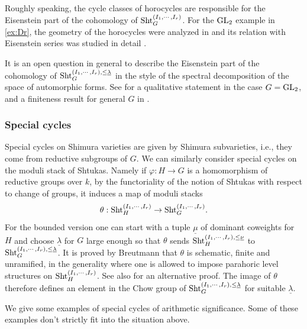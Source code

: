 \documentclass[11pt]{amsart}
\numberwithin{equation}{section}
\theoremstyle{plain}
\theoremstyle{definition}
\newcommand\Sht{\textup{Sht}}
\newcommand\GL{\textup{GL}}
\newcommand\un{\underline}
\newcommand\sss{\subsubsection}
\renewcommand{\th}{\theta}
\newcommand{\ph}{\varphi}
\renewcommand{\l}{\lambda}
\begin{document}
Roughly speaking, the cycle classes of horocycles are responsible for the Eisenstein part of the cohomology of $\Sht_{G}^{(I_{1},\cdots, I_{r})}$. For the $\GL_{2}$ example in \ref{ex:Dr}, the geometry of the horocycles were analyzed in \cite[\S4]{Dr-FBun} and its relation with Eisenstein series was studied in detail \cite[\S3]{Dr-Pet}.

It is an open question in general to describe the Eisenstein part of the cohomology of $\Sht_{G}^{(I_{1},\cdots, I_{r}),\le\un\l}$ in the style of the spectral decomposition of the space of automorphic forms. See \cite[\S7]{YZ1} for a qualitative statement in the case $G=\GL_{2}$, and a finiteness result for general $G$ in \cite{X}.

\sss{Special cycles}

Special cycles on Shimura varieties are given by Shimura subvarieties, i.e., they come from reductive subgroups of $G$. We can similarly consider special cycles on the moduli stack of Shtukas. Namely if $\ph: H\to G$ is a homomorphism of reductive groups over $k$, by the functoriality of the notion of Shtukas with respect to change of groups, it induces a map of moduli stacks
$$\th: \Sht^{(I_{1},\cdots, I_{r})}_{H}\to \Sht^{(I_{1},\cdots, I_{r})}_{G}.$$ 
For the bounded version one can start with a tuple $\un\mu$ of dominant coweights for $H$ and choose $\un\l$ for $G$ large enough so that $\th$ sends $\Sht^{(I_{1},\cdots, I_{r}), \le\un\nu}_{H}$ to $\Sht^{(I_{1},\cdots, I_{r}), \le\un\l}_{G}$.  It is proved by Breutmann \cite{Br} that $\th$ is schematic, finite and unramified, in the generality where one is allowed to impose parahoric level structures on $\Sht^{(I_{1},\cdots, I_{r})}_{H}$.  See also \cite{Y-cycle} for an alternative proof. The image of $\th$ therefore defines an element in the Chow group of $\Sht^{(I_{1},\cdots, I_{r}),\le\un\l}_{G}$ for suitable $\un\l$.

We give some examples of special cycles of arithmetic significance.  Some of these examples don't strictly fit into the situation above.
\end{document}
